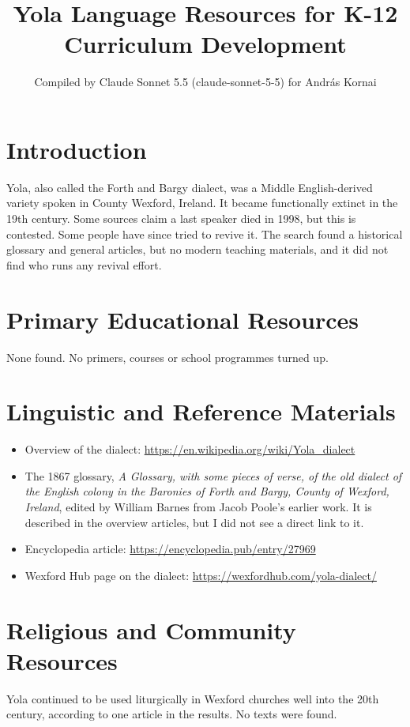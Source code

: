 \documentclass[12pt]{article}
\title{Yola Language Resources for K-12 Curriculum Development}
\author{Compiled by Claude Sonnet 5.5 (claude-sonnet-5-5) for Andr\'as Kornai}
\date{}
\begin{document}
\maketitle

\section{Introduction}
Yola, also called the Forth and Bargy dialect, was a Middle English-derived variety spoken in County Wexford, Ireland. It became functionally extinct in the 19th century. Some sources claim a last speaker died in 1998, but this is contested. Some people have since tried to revive it. The search found a historical glossary and general articles, but no modern teaching materials, and it did not find who runs any revival effort.

\section{Primary Educational Resources}
None found. No primers, courses or school programmes turned up.

\section{Linguistic and Reference Materials}
\begin{itemize}
\item Overview of the dialect: \url{https://en.wikipedia.org/wiki/Yola_dialect}
\item The 1867 glossary, \emph{A Glossary, with some pieces of verse, of the old dialect of the English colony in the Baronies of Forth and Bargy, County of Wexford, Ireland}, edited by William Barnes from Jacob Poole's earlier work. It is described in the overview articles, but I did not see a direct link to it.
\item Encyclopedia article: \url{https://encyclopedia.pub/entry/27969}
\item Wexford Hub page on the dialect: \url{https://wexfordhub.com/yola-dialect/}
\end{itemize}

\section{Religious and Community Resources}
Yola continued to be used liturgically in Wexford churches well into the 20th century, according to one article in the results. No texts were found.
\end{document}
